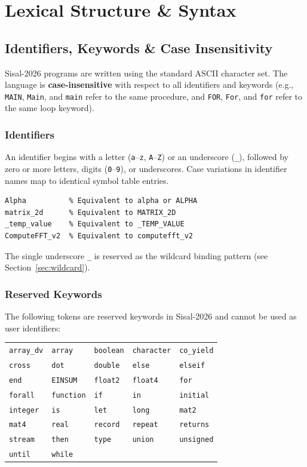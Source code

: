 \chapter{Lexical Structure \& Syntax}
\label{chap:lexical_syntax}

\section{Identifiers, Keywords \& Case Insensitivity}
Sisal-2026 programs are written using the standard ASCII character set. The language is \textbf{case-insensitive} with respect to all identifiers and keywords (e.g., \texttt{MAIN}, \texttt{Main}, and \texttt{main} refer to the same procedure, and \texttt{FOR}, \texttt{For}, and \texttt{for} refer to the same loop keyword).

\subsection{Identifiers}
An identifier begins with a letter (\texttt{a}--\texttt{z}, \texttt{A}--\texttt{Z}) or an underscore (\texttt{\_}), followed by zero or more letters, digits (\texttt{0}--\texttt{9}), or underscores. Case variations in identifier names map to identical symbol table entries.
\begin{lstlisting}[caption={Valid Identifier Examples (Case-Insensitive)}]
Alpha          % Equivalent to alpha or ALPHA
matrix_2d      % Equivalent to MATRIX_2D
_temp_value    % Equivalent to _TEMP_VALUE
ComputeFFT_v2  % Equivalent to computefft_v2
\end{lstlisting}

The single underscore \texttt{\_} is reserved as the wildcard binding pattern (see Section~\ref{sec:wildcard}).

\subsection{Reserved Keywords}
The following tokens are reserved keywords in Sisal-2026 and cannot be used as user identifiers:
\begin{center}
\begin{tabular}{lllll}
\toprule
\texttt{array\_dv} & \texttt{array} & \texttt{boolean} & \texttt{character} & \texttt{co\_yield} \\
\texttt{cross} & \texttt{dot} & \texttt{double} & \texttt{else} & \texttt{elseif} \\
\texttt{end} & \texttt{EINSUM} & \texttt{float2} & \texttt{float4} & \texttt{for} \\
\texttt{forall} & \texttt{function} & \texttt{if} & \texttt{in} & \texttt{initial} \\
\texttt{integer} & \texttt{is} & \texttt{let} & \texttt{long} & \texttt{mat2} \\
\texttt{mat4} & \texttt{real} & \texttt{record} & \texttt{repeat} & \texttt{returns} \\
\texttt{stream} & \texttt{then} & \texttt{type} & \texttt{union} & \texttt{unsigned} \\
\texttt{until} & \texttt{while} & & & \\
\bottomrule
\end{tabular}
\end{center}

